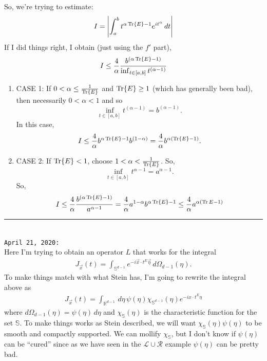 \documentclass{article}
\theoremstyle{definition}
\newcommand{\lag}{\mathcal{L}}
\begin{document}
So, we're trying to estimate:
\begin{equation*}
I=\left|\int_a^bt^{\alpha\Tr{E}-1}e^{it^\alpha}\,dt\right|
\end{equation*}
If I did things right, I obtain (just using the $f'$ part),
\begin{equation*}
I\leq \frac{4}{\alpha}\frac{b^{(\alpha\Tr{E}-1)}}{\inf_{t\in[a,b]}t^{(\alpha-1)}}
\end{equation*}
\begin{enumerate}
\item CASE 1: If $0<\alpha\leq \frac{1}{\Tr{E}}$ and $\Tr{E}\geq 1$ (which has generally been bad), then necessarily $0<\alpha<1$ and so
\begin{equation*}
\inf_{t\in[a,b]}t^{(\alpha-1)}=b^{(\alpha-1)}.
\end{equation*}
In this case, 
\begin{equation*}
I\leq \frac{4}{\alpha}b^{\alpha\Tr{E}-1}b^{(1-\alpha)}=\frac{4}{\alpha}b^{\alpha(\Tr{E}-1)}.
\end{equation*}
\item CASE 2: If $\Tr{E}<1$, choose $1<\alpha<\frac{1}{\Tr{E}}$. So,
\begin{equation*}
\inf_{t\in[a,b]}t^{\alpha-1}=a^{\alpha-1}. 
\end{equation*}
So,
\begin{equation*}
I\leq\frac{4}{\alpha}\frac{b^{(\alpha\Tr{E}-1)}}{a^{\alpha-1}}=\frac{4}{\alpha} a^{1-\alpha}b^{\alpha\Tr{E}-1}\leq \frac{4}{\alpha}a^{\alpha(\Tr E-1)}
\end{equation*}

\end{enumerate}




\hrule
$\,$\\
\noindnet \texttt{April 21, 2020:} \\


\noindent Here I'm trying to obtain an operator $L$ that works for the integral
\begin{align*}
    J_{\vec{x}}(t) = \int_{\mathbb{S}^{d-1}} e^{-i \vec{x} \cdot t^E \vec{\eta}}\,d\Omega_{d-1}(\eta).
\end{align*}
To make things match with what Stein has, I'm going to rewrite the integral above as 
\begin{align*}
    J_{\vec{x}}(t) = \int_{\mathbb{R}^{d-1}}\, d{\eta}\, \psi({\eta})\chi_{\mathbb{S}^{d-1}}({\eta})e^{-i {x}\cdot t^E {\eta}}  
\end{align*}
where $d\Omega_{d-1}(\eta) = \psi(\eta)\,d\eta$ and $\chi_{\mathbb{S}}(\eta)$ is the characteristic function for the set $\mathbb{S}$. To make things works as Stein described, we will want  $\chi_\mathbb{S}(\eta) \psi(\eta)$ to be smooth and compactly supported. We can mollify $\chi_\mathbb{S}$, but I don't know if $\psi(\eta)$ can be ``cured'' since as we have seen in the $\lag \cup \mathcal{R}$ example $\psi(\eta)$ can be pretty bad. \\
\end{document}
